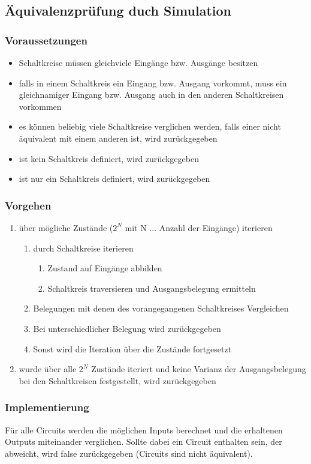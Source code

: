 \subsection{Äquivalenzprüfung duch Simulation}

\subsubsection{Voraussetzungen}
\begin{itemize}
	\item Schaltkreise müssen gleichviele Eingänge bzw. Ausgänge besitzen
	\item falls in einem Schaltkreis ein Eingang bzw. Ausgang vorkommt, muss ein gleichnamiger Eingang bzw. Ausgang auch in den anderen Schaltkreisen vorkommen
	\item es können beliebig viele Schaltkreise verglichen werden, falls einer nicht äquivalent mit einem anderen ist, wird  zurückgegeben
	\item ist kein Schaltkreis definiert, wird  zurückgegeben
	\item ist nur ein Schaltkreis definiert, wird  zurückgegeben

\end{itemize}

\subsubsection{Vorgehen}
\begin{enumerate}
	\item über mögliche Zustände ($2^N$ mit N ... Anzahl der Eingänge) iterieren

	\begin{enumerate}
		\item durch Schaltkreise iterieren
		\begin{enumerate}
			\item Zustand auf Eingänge abbilden
			\item Schaltkreis traversieren und Ausgangsbelegung ermitteln
		\end{enumerate}
		\item Belegungen mit denen des vorangegangenen Schaltkreises Vergleichen
		\item Bei unterschiedlicher Belegung wird  zurückgegeben
		\item Sonst wird die Iteration über die Zustände fortgesetzt
	\end{enumerate}
	
	\item wurde über alle $2^N$ Zustände iteriert und keine Varianz der Ausgangsbelegung bei den Schaltkreisen festgestellt, wird  zurückgegeben
\end{enumerate}


\subsubsection{Implementierung}
Für alle Circuits werden die möglichen Inputs berechnet und die erhaltenen Outputs miteinander verglichen. Sollte dabei ein Circuit enthalten sein, der abweicht, wird false zurückgegeben (Circuits sind nicht äquivalent). 
